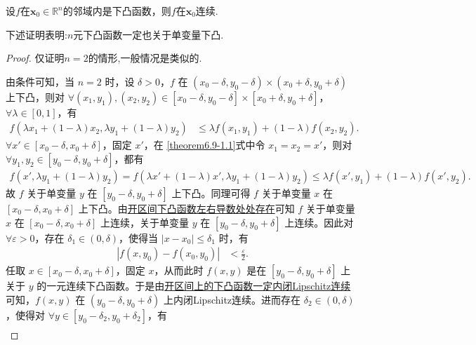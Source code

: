 \documentclass[../../main.tex]{subfiles}
\begin{document}
\begin{theorem}\label{theorem:邻域上下凸的函数一定在这点连续}
设\(f\)在\(\mathbf{x}_0\in\mathbb{R}^n\)的邻域内是下凸函数，则\(f\)在\(\mathbf{x}_0\)连续.
\end{theorem}
\begin{note}
下述证明表明:$n$元下凸函数一定也关于单变量下凸.
\end{note}
\begin{proof}
仅证明$n=2$的情形,一般情况是类似的.

由条件可知，当 \(n = 2\) 时，设 \(\delta>0\)，\(f\) 在 \((x_0 - \delta, y_0 - \delta)\times(x_0 + \delta, y_0 + \delta)\) 上下凸，则对 \(\forall (x_1,y_1),(x_2,y_2)\in [x_0 - \delta, y_0 - \delta]\times[x_0 + \delta, y_0 + \delta]\)，\(\forall \lambda\in[0,1]\)，有
\begin{align}
f(\lambda x_1 + (1 - \lambda)x_2,\lambda y_1 + (1 - \lambda)y_2) &\leqslant \lambda f(x_1,y_1)+(1 - \lambda)f(x_2,y_2). \label{theorem6.9-1.1}
\end{align}
\(\forall x'\in [x_0 - \delta, x_0 + \delta]\)，固定 \(x'\)，在 \eqref{theorem6.9-1.1}式中令 \(x_1 = x_2 = x'\)，则对 \(\forall y_1,y_2\in [y_0 - \delta, y_0 + \delta]\)，都有
\begin{align*}
f(x',\lambda y_1 + (1 - \lambda)y_2) = f(\lambda x' + (1 - \lambda)x',\lambda y_1 + (1 - \lambda)y_2) 
\leqslant \lambda f(x',y_1)+(1 - \lambda)f(x',y_2).
\end{align*}
故 \(f\) 关于单变量 \(y\) 在 \([y_0 - \delta, y_0 + \delta]\) 上下凸。同理可得 \(f\) 关于单变量 \(x\) 在 \([x_0 - \delta, x_0 + \delta]\) 上下凸。由\hyperref[theorem:开区间下凸函数左右导数处处存在]{开区间下凸函数左右导数处处存在}可知 \(f\) 关于单变量 \(x\) 在 \([x_0 - \delta, x_0 + \delta]\) 上连续，关于单变量 \(y\) 在 \([y_0 - \delta, y_0 + \delta]\) 上连续。因此对 \(\forall \varepsilon>0\)，存在 \(\delta_1\in(0,\delta)\)，使得当 \(|x - x_0|\leqslant\delta_1\) 时，有
\begin{align}
|f(x,y_0) - f(x_0,y_0)| &< \frac{\varepsilon}{2}. \label{theorem6.9-2.1}
\end{align}
任取 \(x\in [x_0 - \delta, x_0 + \delta]\)，固定 \(x\)，从而此时 \(f(x,y)\) 是在 \([y_0 - \delta, y_0 + \delta]\) 上关于 \(y\) 的一元连续下凸函数。于是由\hyperref[theorem:开区间上的下凸函数一定内闭Lipschitz连续]{开区间上的下凸函数一定内闭Lipschitz连续}可知，\(f(x,y)\) 在 \((y_0 - \delta, y_0 + \delta)\) 上内闭Lipschitz连续。进而存在 \(\delta_2\in(0,\delta)\)，使得对 \(\forall y\in [y_0 - \delta_2, y_0 + \delta_2]\)，有
\begin{align}

\end{align}
\end{proof}
\end{document}
